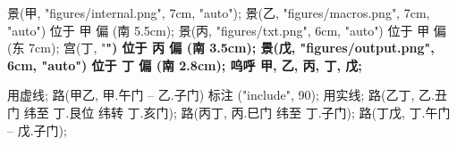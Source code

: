 \usemodule[zhfonts]

景(甲, "figures/internal.png", 7cm, "auto");
景(乙, "figures/macros.png", 7cm, "auto") 位于 甲 偏 (南 5.5cm);
景(丙, "figures/txt.png", 6cm, "auto") 位于 甲 偏 (东 7cm);
宫(丁, "\bf{}") 位于 丙 偏 (南 3.5cm);
景(戊, "figures/output.png", 6cm, "auto") 位于 丁 偏 (南 2.8cm);
呜呼 甲, 乙, 丙, 丁, 戊;

用虚线;
路(甲乙, 甲.午门 -- 乙.子门) 标注 ("include", 90);
用实线;
路(乙丁, 乙.丑门 纬至 丁.艮位 纬转 丁.亥门);
路(丙丁, 丙.巳门 纬至 丁.子门);
路(丁戊, 丁.午门 -- 戊.子门);
\stopuseMPgraphic
\startTEXpage[offset=4pt]
\stopTEXpage
